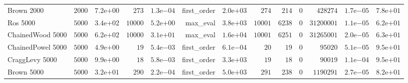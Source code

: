 \begin{longtable}[c]{lrrrrrrrrrrrr}
Brown 2000 & \( 2000\) & \( 7.2\)e\(+00\) & \(  273\) & \( 1.3\)e\(-04\) & first\_order & \( 2.0\)e\(+03\) & \(  274\) & \(  214\) & \(    0\) & \(428274\) & \( 1.7\)e\(-05\) & \( 7.8\)e\(+01\) \\
Ros 5000 & \( 5000\) & \( 3.4\)e\(+02\) & \(10000\) & \( 5.2\)e\(+00\) & max\_eval & \( 3.8\)e\(+03\) & \(10001\) & \( 6238\) & \(    0\) & \(31200001\) & \( 1.1\)e\(-05\) & \( 6.2\)e\(+01\) \\
ChainedWood 5000 & \( 5000\) & \( 6.2\)e\(+02\) & \(10000\) & \( 3.1\)e\(+01\) & max\_eval & \( 1.6\)e\(+04\) & \(10001\) & \( 6251\) & \(    0\) & \(31265001\) & \( 2.0\)e\(-05\) & \( 6.3\)e\(+01\) \\
ChainedPowel 5000 & \( 5000\) & \( 4.9\)e\(+00\) & \(   19\) & \( 5.4\)e\(-03\) & first\_order & \( 6.1\)e\(-04\) & \(   20\) & \(   19\) & \(    0\) & \(95020\) & \( 5.1\)e\(-05\) & \( 9.5\)e\(+01\) \\
CraggLevy 5000 & \( 5000\) & \( 9.9\)e\(+00\) & \(   18\) & \( 5.8\)e\(-03\) & first\_order & \( 3.3\)e\(+03\) & \(   19\) & \(   18\) & \(    0\) & \(90019\) & \( 1.1\)e\(-04\) & \( 9.5\)e\(+01\) \\
Brown 5000 & \( 5000\) & \( 3.2\)e\(+01\) & \(  290\) & \( 2.2\)e\(-04\) & first\_order & \( 5.0\)e\(+03\) & \(  291\) & \(  238\) & \(    0\) & \(1190291\) & \( 2.7\)e\(-05\) & \( 8.2\)e\(+01\) \\
\hline 
\end{longtable}
